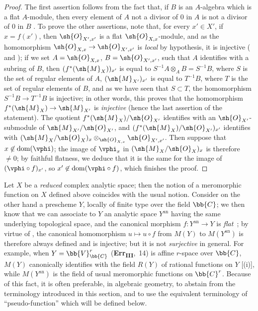 \begin{proof}
The first assertion follows from the fact that, if $B$ is an $A$-algebra which is a flat $A$-module, then every element of $A$ not a divisor of $0$ in $A$ is not a divisor of $0$ in $B$ .
To prove the other assertions, note that, for every $x'\in X'$, if $x=f(x')$, then $\sh{O}_{X',x'}$ is a flat $\sh{O}_{X,x}$-module, and as the homomorphism $\sh{O}_{X,x}\to\sh{O}_{X',x'}$ is \emph{local} by hypothesis, it is injective ( and );
if we set $A=\sh{O}_{X,x}$, $B=\sh{O}_{X',x'}$, such that $A$ identifies with a subring of $B$, then $(f^*(\sh{M}_X))_{x'}$ is equal to $S^{-1}A\otimes_A B=S^{-1}B$, where $S$ is the set of regular elements of $A$, $(\sh{M}_{X'})_{x'}$ is equal to $T^{-1}B$, where $T$ is the set
of regular elements of $B$, and as we have seen that $S\subset T$, the homomorphism $S^{-1}B\to T^{-1}B$ is injective;
in other words, this proves that the homomorphism  $f^*(\sh{M}_X)\to\sh{M}_{X'}$ is \emph{injective} (hence the last assertion of the statement).
The quotient $f^*(\sh{M}_X)/\sh{O}_{X'}$ identifies with an $\sh{O}_{X'}$-submodule of $\sh{M}_{X'}/\sh{O}_{X'}$, and $(f^*(\sh{M}_X)/\sh{O}_{X'})_{x'}$ identifies with $(\sh{M}_X/\sh{O}_X)_x\otimes_{\sh{O}_{X,x}}\sh{O}_{X',x'}$.
Then suppose that $x\not\in\operatorname{dom}(\vphi)$;
the image of $\vphi_x$ in $(\sh{M}_X/\sh{O}_X)_x$ is therefore $\neq 0$;
by faithful flatness, we deduce that it is the same for the image of $(\vphi\circ f)_{x'}$, so $x'\not\in\operatorname{dom}(\vphi\circ f)$, which finishes the proof.
\end{proof}

\begin{remark}[20.1.13]
\label{IV.20.1.13}
Let $X$ be a \emph{reduced} complex analytic space;
then the notion of a meromorphic function on $X$ defined above coincides with the usual notion.
Consider on the other hand a prescheme $Y$, locally of finite type over the field $\bb{C}$;
we then know that we can associate to $Y$ an analytic space $Y^\mathrm{an}$ having the same underlying topological space, and the canonical morphism $f:Y^\mathrm{an}\to Y$ is \emph{flat}~\cite{IV-37};
by virtue of , the canonical homomorphism $u\mapsto u\circ f$ from $M(Y)$ to $M(Y^\mathrm{an})$ is therefore always defined and is injective;
but it is not \emph{surjective} in general.
For example, when $Y=\bb{V}_{\bb{C}}^r$ (\textbf{Err}\textsubscript{\textbf{III}},~14) is affine $r$-space over $\bb{C}$, $M(Y)$ canonically identifies with the field $R(Y)$ of rational functions on $Y$ [(i)], while $M(Y^\mathrm{an})$ is the field of usual meromorphic functions on $\bb{C}^r$.
Because of this fact, it is often preferable, in algebraic geometry, to abstain from the terminology introduced in this section, and to use the equivalent terminology of ``pseudo-function'' which will be defined below.
\end{remark}

